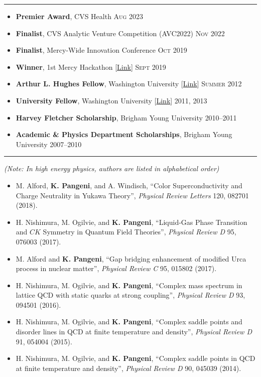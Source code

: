 \documentclass[10pt,letterpaper]{article}
\begin{document}
\hrule
\vspace{0.8ex}
\begin{itemize}
\item \textbf{Premier Award}, CVS Health \hfill \textsc{Aug 2023}
\item \textbf{Finalist}, CVS Analytic Venture Competition (AVC2022) \hfill \textsc{Nov 2022}
\item \textbf{Finalist}, Mercy-Wide Innovation Conference \hfill \textsc{Oct 2019}
\item \textbf{Winner}, 1st Mercy Hackathon [\href{https://www.linkedin.com/feed/update/urn:li:activity:6582628165401792512/}{Link}] \hfill \textsc{Sept 2019}
\item \textbf{Arthur L. Hughes Fellow}, Washington University [\href{https://physics.wustl.edu/graduate#secondary}{Link}] \hfill \textsc{Summer 2012}
\item \textbf{University Fellow}, Washington University [\href{https://physics.wustl.edu/graduate#secondary}{Link}] \hfill \textsc{2011, 2013}
\item \textbf{Harvey Fletcher Scholarship}, Brigham Young University \hfill \textsc{2010--2011}
\item \textbf{Academic \& Physics Department Scholarships}, Brigham Young University \hfill \textsc{2007--2010}
\end{itemize}

\hrule
\vspace{0.8ex}
\textit{\small (Note: In high energy physics, authors are listed in alphabetical order)}

\begin{itemize}
\item M. Alford, \textbf{K. Pangeni}, and A. Windisch, ``Color Superconductivity and Charge Neutrality in Yukawa Theory'', \textit{Physical Review Letters} 120, 082701 (2018).
\item H. Nishimura, M. Ogilvie, and \textbf{K. Pangeni}, ``Liquid-Gas Phase Transition and $CK$ Symmetry in Quantum Field Theories'', \textit{Physical Review D} 95, 076003 (2017).
\item M. Alford and \textbf{K. Pangeni}, ``Gap bridging enhancement of modified Urca process in nuclear matter'', \textit{Physical Review C} 95, 015802 (2017).
\item H. Nishimura, M. Ogilvie, and \textbf{K. Pangeni}, ``Complex mass spectrum in lattice QCD with static quarks at strong coupling'', \textit{Physical Review D} 93, 094501 (2016).
\item H. Nishimura, M. Ogilvie, and \textbf{K. Pangeni}, ``Complex saddle points and disorder lines in QCD at finite temperature and density'', \textit{Physical Review D} 91, 054004 (2015).
\item H. Nishimura, M. Ogilvie, and \textbf{K. Pangeni}, ``Complex saddle points in QCD at finite temperature and density'', \textit{Physical Review D} 90, 045039 (2014).
\end{itemize}
\end{document}
